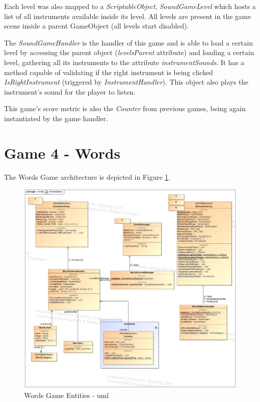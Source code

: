 Each level was also mapped to a \textit{ScriptableObject}, \textit{SoundGameLevel} which hosts a list of all instruments available inside its level. All levels are present in the game scene inside a parent GameObject (all levels start disabled).

The \textit{SoundGameHandler} is the handler of this game and is able to load a certain level by accessing the parent object (\textit{levelsParent} attribute) and loading a certain level, gathering all its instruments to the attribute \textit{instrumentSounds}.
It has a method capable of validating if the right instrument is being clicked \textit{IsRightInstrument} (triggered by \textit{InstrumentHandler}).
This object also plays the instrument's sound for the player to listen.

This game's score metric is also the \textit{Counter} from previous games, being again instantiated by the game handler.

\section{Game 4 - Words}
\label{arqWords}

The Words Game architecture is depicted in Figure \ref{fig:wordsGameArq}.

\begin{figure}[!h]
    \centering
    \includegraphics[width=\linewidth]{Chapters/new_architechture/class__words__WordsGame.jpg}
    \caption{Words Game Entities - \gls{uml}}
    \label{fig:wordsGameArq}
\end{figure}


